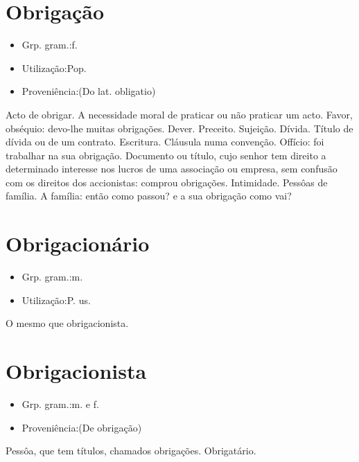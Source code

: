\section{Obrigação}
\begin{itemize}
\item {Grp. gram.:f.}
\end{itemize}
\begin{itemize}
\item {Utilização:Pop.}
\end{itemize}
\begin{itemize}
\item {Proveniência:(Do lat. \textunderscore obligatio\textunderscore )}
\end{itemize}
Acto de obrigar.
A necessidade moral de praticar ou não praticar um acto.
Favor, obséquio: \textunderscore devo-lhe muitas obrigações\textunderscore .
Dever.
Preceito.
Sujeição.
Dívida.
Título de dívida ou de um contrato.
Escritura.
Cláusula numa convenção.
Offício: \textunderscore foi trabalhar na sua obrigação\textunderscore .
Documento ou título, cujo senhor tem direito a determinado interesse nos lucros de uma associação ou empresa, sem confusão com os direitos dos accionistas: \textunderscore comprou obrigações\textunderscore .
Intimidade.
Pessôas de família.
A família: \textunderscore então como passou? e a sua obrigação como vai\textunderscore ?
\section{Obrigacionário}
\begin{itemize}
\item {Grp. gram.:m.}
\end{itemize}
\begin{itemize}
\item {Utilização:P. us.}
\end{itemize}
O mesmo que \textunderscore obrigacionista\textunderscore .
\section{Obrigacionista}
\begin{itemize}
\item {Grp. gram.:m.  e  f.}
\end{itemize}
\begin{itemize}
\item {Proveniência:(De \textunderscore obrigação\textunderscore )}
\end{itemize}
Pessôa, que tem títulos, chamados \textunderscore obrigações\textunderscore .
Obrigatário.
